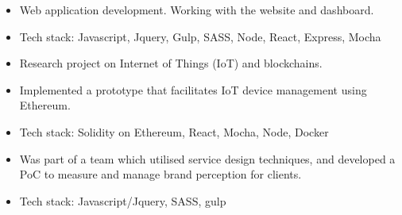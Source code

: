 \documentclass[10pt,a4paper]{altacv}
\begin{document}

\begin{fullwidth}
\makecvheader
\end{fullwidth}


\begin{itemize}
\item Web application development. Working with the website and dashboard.
\item Tech stack: Javascript, Jquery, Gulp, SASS, Node, React, Express, Mocha
\end{itemize}

\divider

\begin{itemize}
\item Research project on Internet of Things (IoT) and blockchains. 
\item Implemented a prototype that facilitates IoT device management using Ethereum.
\item Tech stack: Solidity on Ethereum, React, Mocha, Node, Docker
\end{itemize}

\divider

\begin{itemize}
\item Was part of a team which utilised service design techniques, and developed a PoC to measure and manage brand perception for clients. 
\item Tech stack: Javascript/Jquery, SASS, gulp
\end{itemize}
\divider

\end{document}
